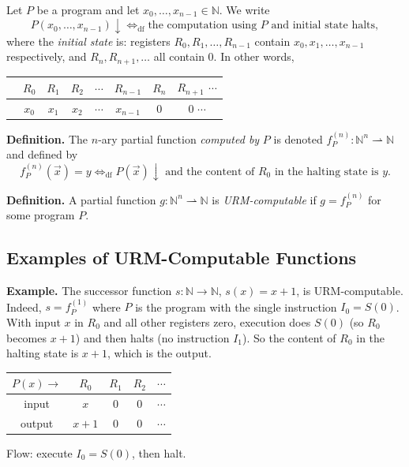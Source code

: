 \documentclass[11pt]{article}
\begin{document}
Let $P$ be a program and let $x_0, \dots, x_{n-1} \in \mathbb{N}$. We write
\[
    P(x_0, \dots, x_{n-1}){\downarrow} \iff_{\mathrm{df}} \text{the computation using $P$ and initial state halts},
\]
where the \emph{initial state} is: registers $R_0, R_1, \dots, R_{n-1}$ contain $x_0, x_1, \dots, x_{n-1}$ respectively, and $R_n, R_{n+1}, \dots$ all contain $0$. In other words,
\begin{center}
\renewcommand{\arraystretch}{1.1}
\begin{tabular}{c|cccc|c|cc}
    & $R_0$ & $R_1$ & $R_2$ & $\cdots$ & $R_{n-1}$ & $R_n$ & $R_{n+1}$ $\cdots$ \\
\hline
    & $x_0$ & $x_1$ & $x_2$ & $\cdots$ & $x_{n-1}$ & $0$ & $0$ $\cdots$
\end{tabular}
\end{center}

\textbf{Definition.} The $n$-ary partial function \emph{computed by} $P$ is denoted $f_P^{(n)}\colon \mathbb{N}^n \rightharpoonup \mathbb{N}$ and defined by
\[
    f_P^{(n)}(\vec{x}) = y \iff_{\mathrm{df}} P(\vec{x}){\downarrow} \text{ and the content of } R_0 \text{ in the halting state is } y.
\]

\textbf{Definition.} A partial function $g\colon \mathbb{N}^n \rightharpoonup \mathbb{N}$ is \emph{URM-computable} if $g = f_P^{(n)}$ for some program $P$.

\subsection{Examples of URM-Computable Functions}

\textbf{Example.} The successor function $s\colon \mathbb{N} \to \mathbb{N}$, $s(x) = x + 1$, is URM-computable. Indeed, $s = f_P^{(1)}$ where $P$ is the program with the single instruction $I_0 = S(0)$. With input $x$ in $R_0$ and all other registers zero, execution does $S(0)$ (so $R_0$ becomes $x+1$) and then halts (no instruction $I_1$). So the content of $R_0$ in the halting state is $x+1$, which is the output.

\begin{center}
\renewcommand{\arraystretch}{1.1}
\begin{tabular}{c|ccc|c}
    $P(x) \to$ & $R_0$ & $R_1$ & $R_2$ & $\cdots$ \\
\hline
    input & $x$ & $0$ & $0$ & $\cdots$ \\
    output & $x+1$ & $0$ & $0$ & $\cdots$
\end{tabular}
\end{center}
Flow: execute $I_0 = S(0)$, then halt.
\end{document}
